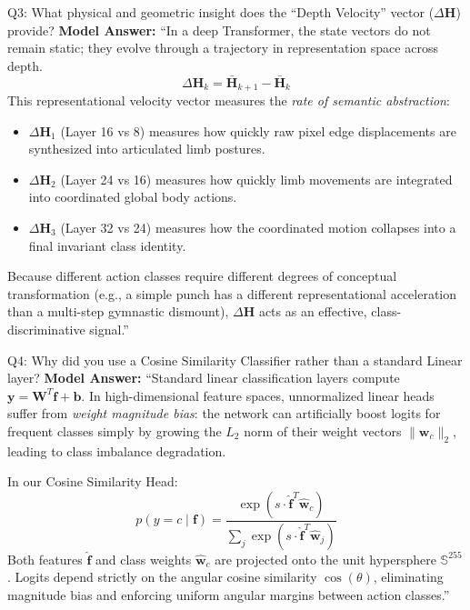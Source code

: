 \documentclass[a4paper, 11pt]{article}
\begin{document}
\vspace{0.2cm}

\begin{defensebox}{Q3: What physical and geometric insight does the ``Depth Velocity'' vector ($\Delta\mathbf{H}$) provide?}
\textbf{Model Answer:}
``In a deep Transformer, the state vectors do not remain static; they evolve through a trajectory in representation space across depth.
$$\Delta\mathbf{H}_k = \bar{\mathbf{H}}_{k+1} - \bar{\mathbf{H}}_k$$
This representational velocity vector measures the \emph{rate of semantic abstraction}:
\begin{itemize}
    \item $\Delta\mathbf{H}_1$ (Layer 16 vs 8) measures how quickly raw pixel edge displacements are synthesized into articulated limb postures.
    \item $\Delta\mathbf{H}_2$ (Layer 24 vs 16) measures how quickly limb movements are integrated into coordinated global body actions.
    \item $\Delta\mathbf{H}_3$ (Layer 32 vs 24) measures how the coordinated motion collapses into a final invariant class identity.
\end{itemize}
Because different action classes require different degrees of conceptual transformation (e.g., a simple punch has a different representational acceleration than a multi-step gymnastic dismount), $\Delta\mathbf{H}$ acts as an effective, class-discriminative signal.''
\end{defensebox}

\vspace{0.2cm}

\begin{defensebox}{Q4: Why did you use a Cosine Similarity Classifier rather than a standard Linear layer?}
\textbf{Model Answer:}
``Standard linear classification layers compute $\mathbf{y} = \mathbf{W}^T \mathbf{f} + \mathbf{b}$. In high-dimensional feature spaces, unnormalized linear heads suffer from \emph{weight magnitude bias}: the network can artificially boost logits for frequent classes simply by growing the $L_2$ norm of their weight vectors $\|\mathbf{w}_c\|_2$, leading to class imbalance degradation.

In our Cosine Similarity Head:
$$p(y=c \mid \mathbf{f}) = \frac{\exp(s \cdot \hat{\mathbf{f}}^T \hat{\mathbf{w}}_c)}{\sum_j \exp(s \cdot \hat{\mathbf{f}}^T \hat{\mathbf{w}}_j)}$$
Both features $\hat{\mathbf{f}}$ and class weights $\hat{\mathbf{w}}_c$ are projected onto the unit hypersphere $\mathbb{S}^{255}$. Logits depend strictly on the angular cosine similarity $\cos(\theta)$, eliminating magnitude bias and enforcing uniform angular margins between action classes.''
\end{defensebox}
\end{document}
